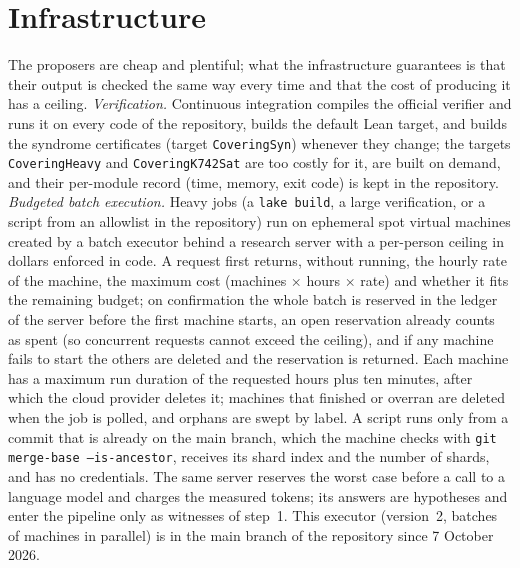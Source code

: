 \documentclass[11pt]{amsart}
\theoremstyle{definition}
\theoremstyle{remark}
\begin{document}
\section{Infrastructure}\label{sec:infra}
The proposers are cheap and plentiful; what the infrastructure guarantees is that their output is checked the same way every time and that the cost of producing it has a ceiling.
\emph{Verification.} Continuous integration compiles the official verifier and runs it on every code of the repository, builds the default Lean target, and builds the syndrome certificates (target \texttt{CoveringSyn}) whenever they change; the targets \texttt{CoveringHeavy} and \texttt{CoveringK742Sat} are too costly for it, are built on demand, and their per-module record (time, memory, exit code) is kept in the repository.
\emph{Budgeted batch execution.} Heavy jobs (a \texttt{lake build}, a large verification, or a script from an allowlist in the repository) run on ephemeral spot virtual machines created by a batch executor behind a research server with a per-person ceiling in dollars enforced in code. A request first returns, without running, the hourly rate of the machine, the maximum cost (machines $\times$ hours $\times$ rate) and whether it fits the remaining budget; on confirmation the whole batch is reserved in the ledger of the server before the first machine starts, an open reservation already counts as spent (so concurrent requests cannot exceed the ceiling), and if any machine fails to start the others are deleted and the reservation is returned. Each machine has a maximum run duration of the requested hours plus ten minutes, after which the cloud provider deletes it; machines that finished or overran are deleted when the job is polled, and orphans are swept by label. A script runs only from a commit that is already on the main branch, which the machine checks with \texttt{git merge-base --is-ancestor}, receives its shard index and the number of shards, and has no credentials. The same server reserves the worst case before a call to a language model and charges the measured tokens; its answers are hypotheses and enter the pipeline only as witnesses of step~1.
This executor (version~2, batches of machines in parallel) is in the main branch of the repository since 7 October 2026.
\end{document}
